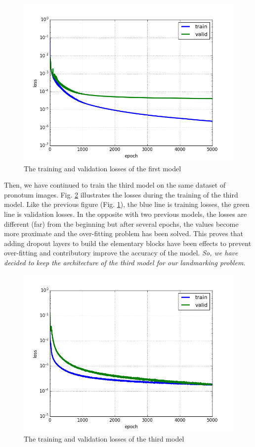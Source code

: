 \documentclass[review]{elsarticle}
\begin{document}
\begin{figure}[!h]
	\centering
	\includegraphics[scale=0.4]{images/cnnmodel3_5000_pronotum_v13_without_dropout_normalized_data_loss}
	\caption{The training and validation losses of the first model}
	\label{figloss1}
\end{figure}

Then, we have continued to train the third model on the same dataset of pronotum images. Fig. \ref{figloss2} illustrates the losses during the training of the third model. Like the previous figure (Fig. \ref{figloss1}), the blue line is training losses, the green line is validation losses. In the opposite with two previous models, the losses are different (far) from the beginning but after several epochs, the values become more proximate and the over-fitting problem has been solved. This proves that adding dropout layers to build the elementary blocks have been effects to prevent over-fitting and contributory improve the accuracy of the model. \textit{So, we have decided to keep the architecture of the third model for our landmarking problem.}

\begin{figure}[!h]
	\centering
	\includegraphics[scale=0.4]{images/loss_v16}
	\caption{The training and validation losses of the third model}
	\label{figloss2}
\end{figure}
\end{document}
